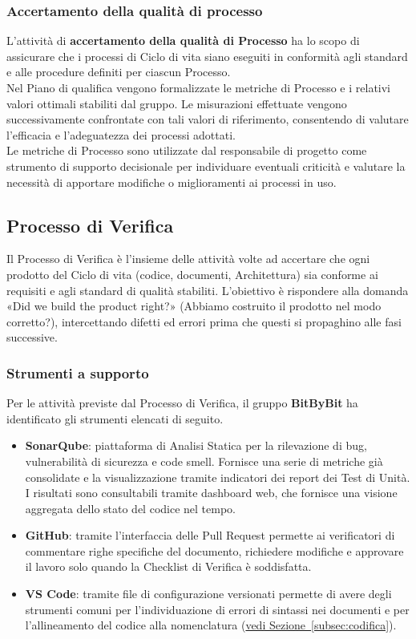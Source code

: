 \documentclass[a4paper,12pt]{article}
\newcommand{\ignoreglossary}{}
\begin{document}
\subsubsection{Accertamento della qualità di \ignoreglossary{processo}}
L’attività di \textbf{accertamento della qualità di Processo} ha lo scopo di assicurare che i processi di Ciclo di vita siano eseguiti in conformità agli standard e alle procedure definiti per ciascun Processo.\\
Nel Piano di qualifica vengono formalizzate le metriche di Processo e i relativi valori ottimali stabiliti dal gruppo.
Le misurazioni effettuate vengono successivamente confrontate con tali valori di riferimento, consentendo di valutare l’efficacia e l’adeguatezza dei processi adottati.\\
Le metriche di Processo sono utilizzate dal responsabile di progetto come strumento di supporto decisionale per individuare eventuali criticità e valutare la necessità di apportare modifiche o miglioramenti ai processi in uso.

\subsection{Processo di \ignoreglossary{Verifica}} \label{sec:processo-verifica}
Il Processo di Verifica è l'insieme delle attività volte ad accertare che ogni prodotto del Ciclo di vita (codice, documenti, Architettura) sia conforme ai requisiti e agli standard di qualità stabiliti.
L'obiettivo è rispondere alla domanda «Did we build the product right?» (Abbiamo costruito il prodotto nel modo corretto?), intercettando difetti ed errori prima che questi si propaghino alle fasi successive.

\subsubsection{Strumenti a supporto}
Per le attività previste dal Processo di Verifica, il gruppo \textbf{BitByBit} ha identificato gli strumenti elencati di seguito.
\begin{itemize}
    \item \textbf{SonarQube}: piattaforma di Analisi Statica per la rilevazione di bug, 
    vulnerabilità di sicurezza e code smell. Fornisce una serie di metriche già consolidate e la visualizzazione tramite indicatori dei report dei Test di Unità.
    I risultati sono consultabili tramite dashboard web, che fornisce una visione aggregata dello stato del codice nel tempo.
    \item \textbf{GitHub}: tramite l'interfaccia delle Pull Request permette ai verificatori di commentare righe specifiche del documento, richiedere modifiche e approvare il lavoro solo quando la Checklist di Verifica è soddisfatta.
    \item \textbf{VS Code}: tramite file di configurazione versionati permette di avere degli strumenti comuni per l'individuazione 
    di errori di sintassi nei documenti e per l'allineamento del codice alla nomenclatura (\hyperref[subsec:codifica]{vedi Sezione~\ref*{subsec:codifica}}).
\end{itemize}
\end{document}
